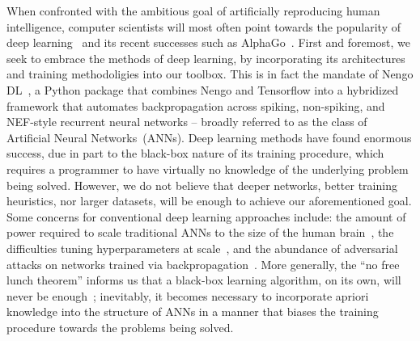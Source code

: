 When confronted with the ambitious goal of artificially reproducing human intelligence, computer scientists will most often point towards
the popularity of deep learning~\citep{lecun2015deep} and its recent successes such as AlphaGo~\citep{gibney2016google}.
First and foremost, we seek to embrace the methods of deep learning, by incorporating its architectures and training methodoligies into our toolbox.
This is in fact the mandate of Nengo DL~\citep{rasmussen2018nengodl}, a Python package that combines Nengo and Tensorflow into a hybridized framework that automates backpropagation across spiking, non-spiking, and NEF-style recurrent neural networks -- broadly referred to as the class of Artificial Neural Networks~(ANNs).
Deep learning methods have found enormous success, due in part to the black-box nature of its training procedure, which requires a programmer to have virtually no knowledge of the underlying problem being solved.
However, we do not believe that deeper networks, better training heuristics, nor larger datasets, will be enough to achieve our aforementioned goal.
Some concerns for conventional deep learning approaches include: the amount of power required to scale traditional ANNs to the size of the human brain~\citep{furber2012build}, the difficulties tuning hyperparameters at scale~\citep{bergstra2015hyperopt}, and the abundance of adversarial attacks on networks trained via backpropagation~\citep{su2019one}.
More generally, the ``no free lunch theorem'' informs us that a black-box learning algorithm, on its own, will never be enough~\citep{wolpert1996lack}; inevitably, it becomes necessary to incorporate apriori knowledge into the structure of ANNs in a manner that biases the training procedure towards the problems being solved.

